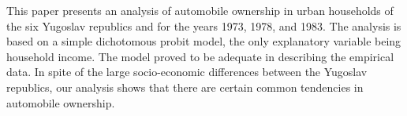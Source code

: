 This paper presents an analysis of automobile ownership in urban households of the six Yugoslav republics and for the years 1973, 1978, and 1983. The analysis is based on a simple dichotomous probit model, the only explanatory variable being household income. The model proved to be adequate in describing the empirical data. In spite of the large socio-economic differences between the Yugoslav republics, our analysis shows that there are certain common tendencies in automobile ownership.
